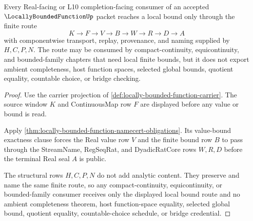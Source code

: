 \begin{theorem}
\label{thm:locally-bounded-function-finite-window-bound-route}
Every Real-facing or L10 completion-facing consumer of an accepted $\LocallyBoundedFunctionUp$ packet reaches a local bound only through the finite route
$$
K\longrightarrow F\longrightarrow V\longrightarrow B\longrightarrow W\longrightarrow R\longrightarrow D\longrightarrow A
$$
with componentwise transport, replay, provenance, and naming supplied by $H,C,P,N$. The route may be consumed by compact-continuity, equicontinuity, and bounded-family chapters that need local finite bounds, but it does not export ambient completeness, host function spaces, selected global bounds, quotient equality, countable choice, or bridge checking.
\end{theorem}
\begin{proof}
Use the carrier projection of \autoref{def:locally-bounded-function-carrier}. The source window $K$ and ContinuousMap row $F$ are displayed before any value or bound is read.

Apply \autoref{thm:locally-bounded-function-namecert-obligations}. Its value-bound exactness clause forces the Real value row $V$ and the finite bound row $B$ to pass through the StreamName, RegSeqRat, and DyadicRatCore rows $W,R,D$ before the terminal Real seal $A$ is public.

The structural rows $H,C,P,N$ do not add analytic content. They preserve and name the same finite route, so any compact-continuity, equicontinuity, or bounded-family consumer receives only the displayed local bound route and no ambient completeness theorem, host function-space equality, selected global bound, quotient equality, countable-choice schedule, or bridge credential.
\end{proof}


\begin{closurestatus}{\LocallyBoundedFunctionUp}
  \theoryclosure{\seedClosure}
  \formalstatus{\unformalizedV}
\end{closurestatus}
